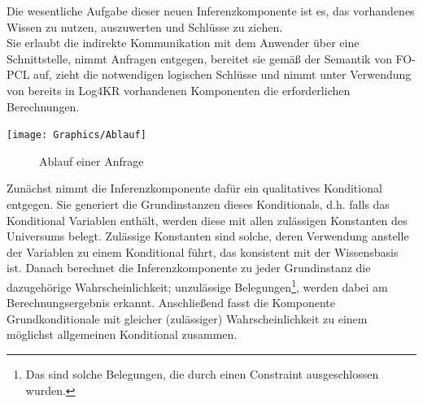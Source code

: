 \documentclass[a4paper, 11pt]{book}
\begin{document}
Die wesentliche Aufgabe dieser neuen Inferenzkomponente ist es, das vorhandenes Wissen zu nutzen, auszuwerten und Schlüsse zu ziehen.\\
Sie erlaubt die indirekte Kommunikation mit dem Anwender über eine Schnittstelle, nimmt Anfragen entgegen, bereitet sie gemäß der Semantik von FO-PCL auf, zieht die notwendigen logischen Schlüsse und nimmt unter Verwendung von bereits in Log4KR vorhandenen Komponenten die erforderlichen Berechnungen.
 
\texttt{[image: Graphics/Ablauf]}
\begin{figure}[h]
	\caption{Ablauf einer Anfrage}
	\label{Ablauf}
\end{figure}
 
Zunächst nimmt die Inferenzkomponente dafür ein qualitatives Konditional entgegen. Sie generiert die Grundinstanzen dieses Konditionals, d.h. falls das Konditional Variablen enthält, werden diese mit allen zulässigen Konstanten des Universums belegt. Zulässige Konstanten sind solche, deren Verwendung anstelle der Variablen zu einem Konditional führt, das konsistent mit der Wissensbasis ist. Danach berechnet die Inferenzkomponente zu jeder Grundinstanz die dazugehörige Wahrscheinlichkeit; unzulässige Belegungen\footnote{Das sind solche Belegungen, die durch einen Constraint ausgeschlossen wurden.}, werden dabei am Berechnungsergebnis erkannt. Anschließend fasst die Komponente Grundkonditionale mit gleicher (zulässiger) Wahrscheinlichkeit zu einem möglichst allgemeinen Konditional zusammen.
\end{document}
